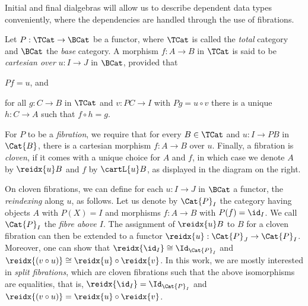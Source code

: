 \documentclass[preprint]{sigplanconf}
\begin{document}
Initial and final dialgebras will allow us to describe dependent data types
conveniently, where the dependencies are handled through the use of fibrations.
\begin{definition}
  \label{def:fibration}
  Let $P : \TCat \to \BCat$ be a functor, where $\TCat$ is called the
  \emph{total} category and $\BCat$ the \emph{base} category.
  A morphism $f : A \to B$ in $\TCat$ is said to be \emph{cartesian over}
  $u : I \to J$ in $\BCat$, provided that
  \begin{enumerate*}[label=\roman*)]
  \item $P f = u$, and
  \item for all $g : C \to B$ in $\TCat$ and $v : PC \to I$ with
    $Pg = u \circ v$ there is a unique $h : C \to A$ such that $f \circ h = g$.
  \end{enumerate*}
  For $P$ to be a \emph{fibration}, we require that
  for every $B \in \TCat$ and $u : I \to PB$ in $\Cat{B}$, there is
  a cartesian morphism $f : A \to B$ over $u$.
  Finally, a fibration is \emph{cloven}, if it comes with a unique choice
  for $A$ and $f$, in which case we denote $A$ by $\reidx{u}B$ and
  $f$ by $\cartL{u} B$, as displayed in the diagram on the right.
\end{definition}

\begin{wrapfigure}[7]{r}{.2\textwidth}
\vspace{-1.2\baselineskip}
\hspace*{-20pt}
\end{wrapfigure}

On cloven fibrations, we can define for each $u : I \to J$ in $\BCat$
a functor, the \emph{reindexing} along $u$, as follows.
Let us denote by $\Cat{P}_I$ the category
having objects $A$ with $P(X) = I$ and morphisms $f : A \to B$ with
$P(f) = \id_I$.
We call $\Cat{P}_I$ the \emph{fibre above $I$}.
The assignment of $\reidx{u} B$ to $B$ for a cloven fibration can then be
extended to a functor $\reidx{u} : \Cat{P}_J \to \Cat{P}_I$.
Moreover, one can show that $\reidx{\id_I} \cong \Id_{\Cat{P}_I}$ and
$\reidx{(v \circ u)} \cong \reidx{u} \circ \reidx{v}$.
In this work, we are mostly interested in \emph{split fibrations},
which are cloven fibrations such that the above isomorphisms are
equalities, that is, $\reidx{\id_I} = \Id_{\Cat{P}_I}$ and
$\reidx{(v \circ u)} = \reidx{u} \circ \reidx{v}$.
\end{document}
